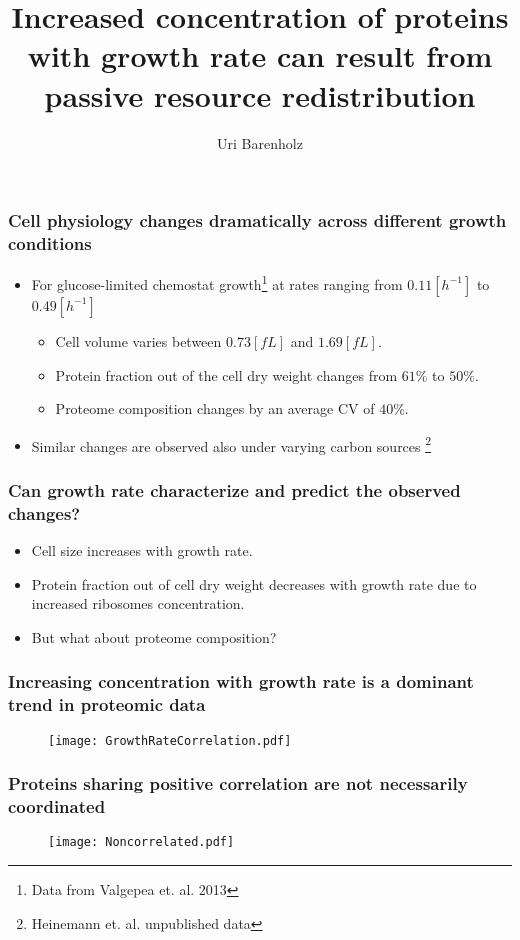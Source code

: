 \documentclass{beamer}
\title{Increased concentration of proteins with growth rate can result from passive resource redistribution}
\author{Uri Barenholz}
\begin{document}
\maketitle
\begin{frame}
\frametitle{Cell physiology changes dramatically across different growth conditions}
\begin{itemize}
\item For glucose-limited chemostat growth\footnote{Data from Valgepea et. al. 2013} at rates ranging from $0.11 [h^{-1}]$ to $0.49 [h^{-1}]$
\begin{itemize}
\item Cell volume varies between $0.73 [fL]$ and $1.69 [fL]$.
\item Protein fraction out of the cell dry weight changes from $61\%$ to $50\%$.
\item Proteome composition changes by an average CV of $40\%$.
\end{itemize}
\item Similar changes are observed also under varying carbon sources
\footnote{Heinemann et. al. unpublished data}
\end{itemize}
\end{frame}

\begin{frame}
\frametitle{Can growth rate characterize and predict the observed changes?}
\begin{itemize}
\item Cell size increases with growth rate.
\item Protein fraction out of cell dry weight decreases with growth rate due to increased ribosomes concentration.
\item But what about proteome composition?
\end{itemize}
\end{frame}

\begin{frame}
\frametitle{Increasing concentration with growth rate is a dominant trend in proteomic data}
\begin{figure}[h!]
\centering
\texttt{[image: GrowthRateCorrelation.pdf]}
\end{figure}
\end{frame}

\begin{frame}
\frametitle{Proteins sharing positive correlation are not necessarily coordinated}
\begin{figure}[h!]
\centering
\texttt{[image: Noncorrelated.pdf]}
\end{figure}
\end{frame}
\end{document}
